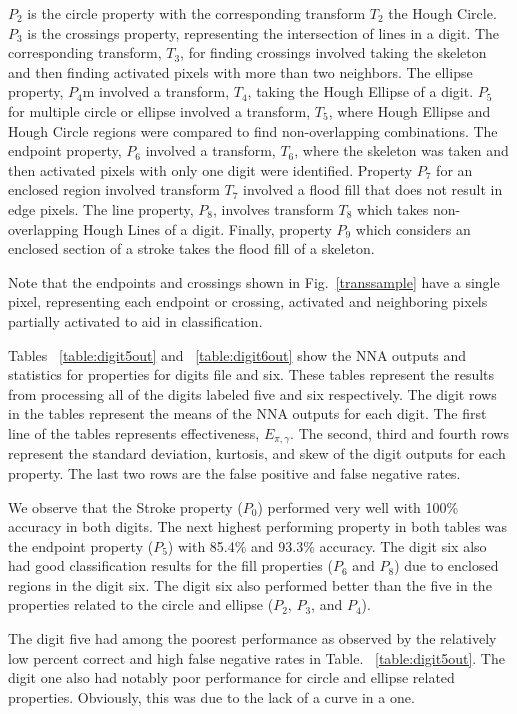 \documentclass[conference]{IEEEtran}
\begin{document}
$P_2$ is the circle property with the corresponding transform $T_2$ the Hough Circle.  $P_3$ is the crossings property, representing the intersection of lines in a digit.  The corresponding transform, $T_3$, for finding crossings involved taking the skeleton and then finding activated pixels with more than two neighbors.  The ellipse property, $P_4$m involved a transform, $T_4$, taking the Hough Ellipse of a digit.  $P_5$ for multiple circle or ellipse involved a transform, $T_5$, where Hough Ellipse and Hough Circle regions were compared to find non-overlapping combinations.   The endpoint property, $P_6$ involved a transform, $T_6$, where the skeleton was taken and then activated pixels with only one digit were identified.  Property $P_7$ for an enclosed region involved transform $T_7$ involved a flood fill that does not result in edge pixels.  The line property, $P_8$, involves transform $T_8$ which takes non-overlapping Hough Lines of a digit.  Finally, property $P_9$ which considers an enclosed section of a stroke takes the flood fill of a skeleton.

Note that the endpoints and crossings shown in Fig.~\ref{transsample} have a single pixel, representing each endpoint or crossing, activated and neighboring pixels partially activated to aid in classification.

Tables ~\ref{table:digit5out} and ~\ref{table:digit6out} show the NNA outputs and statistics for properties for digits file and six.  These tables represent the results from processing all of the digits labeled five and six respectively.   The digit rows in the tables represent the means of the NNA outputs for each digit.  The first line of the tables represents effectiveness, $E_{\pi,\gamma}$.  The second, third and fourth rows represent the standard deviation, kurtosis, and skew of the digit outputs for each property.  The last two rows are the false positive and false negative rates.

We observe that the Stroke property ($P_0$) performed very well with 100\% accuracy in both digits.  The next highest performing property in both tables was the endpoint property ($P_5$) with 85.4\% and 93.3\% accuracy.  The digit six also had good classification results for the fill properties ($P_6$ and $P_8$) due to enclosed regions in the digit six.  The digit six also performed better than the five in the properties related to the circle and ellipse ($P_2$, $P_3$, and $P_4$).

The digit five had among the poorest performance as observed by the relatively low percent correct and high false negative rates in Table. ~\ref{table:digit5out}.  The digit one also had notably poor performance for circle and ellipse related properties.  Obviously, this was due to the lack of a curve in a one.
\end{document}
